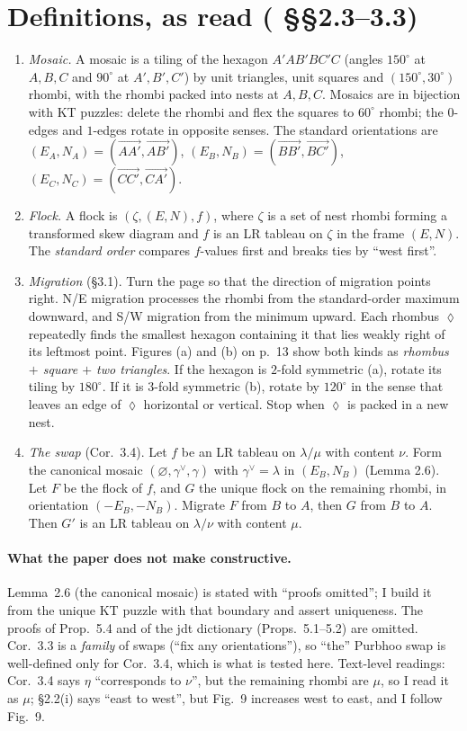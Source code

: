 \documentclass[11pt]{article}
\theoremstyle{definition}
\begin{document}
\section{Definitions, as read (\cite{P} \S\S2.3--3.3)}
\begin{enumerate}
\item \emph{Mosaic.} A mosaic is a tiling of the hexagon $A'AB'BC'C$ (angles $150^\circ$ at $A,B,C$ and $90^\circ$ at $A',B',C'$)
by unit triangles, unit squares and $(150^\circ,30^\circ)$ rhombi, with the rhombi packed into nests at $A,B,C$. Mosaics
are in bijection with KT puzzles: delete the rhombi and flex the squares to $60^\circ$ rhombi; the $0$-edges and
$1$-edges rotate in opposite senses. The standard orientations are $(E_A,N_A)=(\vec{AA'},\vec{AB'})$,
$(E_B,N_B)=(\vec{BB'},\vec{BC'})$, $(E_C,N_C)=(\vec{CC'},\vec{CA'})$.
\item \emph{Flock.} A flock is $(\zeta,(E,N),f)$, where $\zeta$ is a set of nest rhombi forming a transformed skew
diagram and $f$ is an LR tableau on $\zeta$ in the frame $(E,N)$. The \emph{standard order} compares $f$-values first
and breaks ties by ``west first''.
\item \emph{Migration} (\S3.1). Turn the page so that the direction of migration points right. N/E migration processes
the rhombi from the standard-order maximum downward, and S/W migration from the minimum upward. Each rhombus
$\lozenge$ repeatedly finds the smallest hexagon containing it that lies weakly right of its leftmost point.
Figures (a) and (b) on p.~13 show both kinds as \emph{rhombus $+$ square $+$ two triangles}. If the hexagon is
$2$-fold symmetric (a), rotate its tiling by $180^\circ$. If it is $3$-fold symmetric (b), rotate by $120^\circ$ in
the sense that leaves an edge of $\lozenge$ horizontal or vertical. Stop when $\lozenge$ is packed in a new nest.
\item \emph{The swap} (Cor.~3.4). Let $f$ be an LR tableau on $\lambda/\mu$ with content $\nu$. Form the canonical mosaic
$(\varnothing,\gamma^\vee,\gamma)$ with $\gamma^\vee=\lambda$ in $(E_B,N_B)$ (Lemma 2.6). Let $F$ be the flock of $f$,
and $G$ the unique flock on the remaining rhombi, in orientation $(-E_B,-N_B)$. Migrate $F$ from $B$ to $A$, then
$G$ from $B$ to $A$. Then $G'$ is an LR tableau on $\lambda/\nu$ with content $\mu$.
\end{enumerate}
\paragraph{What the paper does not make constructive.} Lemma~2.6 (the canonical mosaic) is stated with ``proofs
omitted''; I build it from the unique KT puzzle with that boundary and assert uniqueness. The proofs of Prop.~5.4 and
of the jdt dictionary (Props.~5.1--5.2) are omitted. Cor.~3.3 is a \emph{family} of swaps (``fix any orientations''),
so ``the'' Purbhoo swap is well-defined only for Cor.~3.4, which is what is tested here. Text-level readings:
Cor.~3.4 says $\eta$ ``corresponds to $\nu$'', but the remaining rhombi are $\mu$, so I read it as $\mu$;
\S2.2(i) says ``east to west'', but Fig.~9 increases west to east, and I follow Fig.~9.
\end{document}
